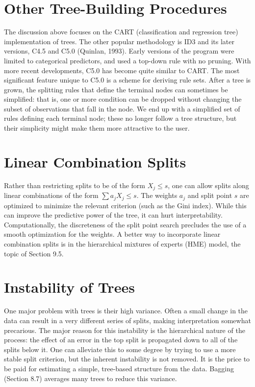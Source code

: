\documentclass[10pt]{article}
\begin{document}
\section*{Other Tree-Building Procedures}
The discussion above focuses on the CART (classification and regression tree) implementation of trees. The other popular methodology is ID3 and its later versions, C4.5 and C5.0 (Quinlan, 1993). Early versions of the program were limited to categorical predictors, and used a top-down rule with no pruning. With more recent developments, C5.0 has become quite similar to CART. The most significant feature unique to C5.0 is a scheme for deriving rule sets. After a tree is grown, the splitting rules that define the terminal nodes can sometimes be simplified: that is, one or more condition can be dropped without changing the subset of observations that fall in the node. We end up with a simplified set of rules defining each terminal node; these no longer follow a tree structure, but their simplicity might make them more attractive to the user.

\section*{Linear Combination Splits}
Rather than restricting splits to be of the form $X_{j} \leq s$, one can allow splits along linear combinations of the form $\sum a_{j} X_{j} \leq s$. The weights $a_{j}$ and split point $s$ are optimized to minimize the relevant criterion (such as the Gini index). While this can improve the predictive power of the tree, it can hurt interpretability. Computationally, the discreteness of the split point search precludes the use of a smooth optimization for the weights. A better way to incorporate linear combination splits is in the hierarchical mixtures of experts (HME) model, the topic of Section 9.5.

\section*{Instability of Trees}
One major problem with trees is their high variance. Often a small change in the data can result in a very different series of splits, making interpretation somewhat precarious. The major reason for this instability is the hierarchical nature of the process: the effect of an error in the top split is propagated down to all of the splits below it. One can alleviate this to some degree by trying to use a more stable split criterion, but the inherent instability is not removed. It is the price to be paid for estimating a simple, tree-based structure from the data. Bagging (Section 8.7) averages many trees to reduce this variance.
\end{document}
